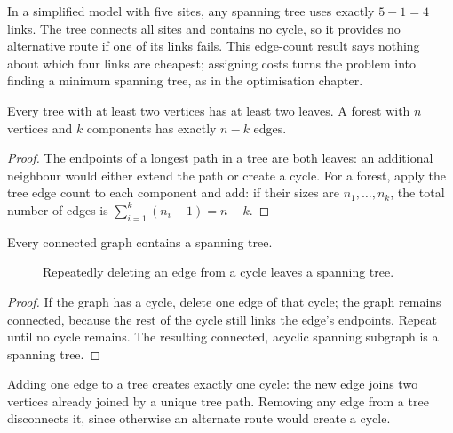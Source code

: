 \begin{example}
In a simplified model with five sites, any spanning tree uses exactly $5-1=4$ links. The tree connects all sites and contains no cycle, so it provides no alternative route if one of its links fails. This edge-count result says nothing about which four links are cheapest; assigning costs turns the problem into finding a minimum spanning tree, as in the optimisation chapter.
\end{example}

\begin{corollary}
Every tree with at least two vertices has at least two leaves. A forest with $n$ vertices and $k$ components has exactly $n-k$ edges.
\end{corollary}
\begin{proof}
The endpoints of a longest path in a tree are both leaves: an additional neighbour would either extend the path or create a cycle. For a forest, apply the tree edge count to each component and add: if their sizes are $n_1,\ldots,n_k$, the total number of edges is $\sum_{i=1}^k(n_i-1)=n-k$.
\end{proof}

\begin{proposition}
Every connected graph contains a spanning tree.
\end{proposition}
\begin{figure}[htbp]
\centering
{}
\caption{Repeatedly deleting an edge from a cycle leaves a spanning tree.}
\end{figure}
\begin{proof}
If the graph has a cycle, delete one edge of that cycle; the graph remains connected, because the rest of the cycle still links the edge's endpoints. Repeat until no cycle remains. The resulting connected, acyclic spanning subgraph is a spanning tree.
\end{proof}

Adding one edge to a tree creates exactly one cycle: the new edge joins two vertices already joined by a unique tree path. Removing any edge from a tree disconnects it, since otherwise an alternate route would create a cycle.

